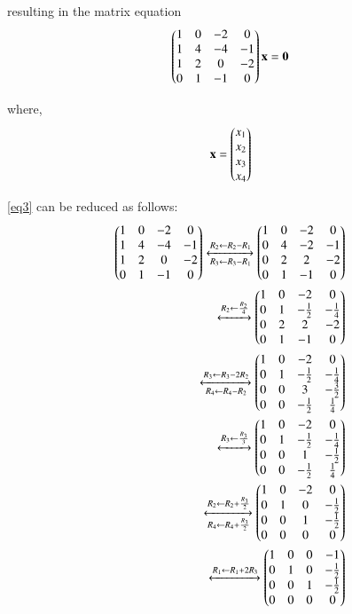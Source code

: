 \documentclass[journal,12pt,twocolumn]{IEEEtran}
\begin{document}
resulting in the matrix equation
\begin{align}
    \begin{pmatrix}1 & 0 & -2 & 0\\
           1 & 4 & -4 & -1\\
           1 & 2 & 0 & -2\\
           0 & 1 & -1 & 0\end{pmatrix}\mathbf{x}
           =\mathbf{0}    \label{eq3}
\end{align}

where,
\begin{align}
   \mathbf{x}= \begin{pmatrix}x_{1}\\x_{2}\\x_{3}\\x_{4}\end{pmatrix}
\end{align}

\eqref{eq3} can be reduced as follows:
\begin{align}
    \begin{pmatrix}1 & 0 & -2 & 0\\
           1 & 4 & -4 & -1\\
           1 & 2 & 0 & -2\\
           0 & 1 & -1 & 0\end{pmatrix}
    \xleftrightarrow[R_{3}\leftarrow R_3-R_{1}]{R_{2}\leftarrow R_2- R_1}
    \begin{pmatrix}1 & 0 & -2 & 0\\
           0 & 4 & -2 & -1\\
           0 & 2 & 2 & -2\\
           0 & 1 & -1 & 0\end{pmatrix}\\
    \xleftrightarrow{R_2 \leftarrow \frac{R_2}{4}}
    \begin{pmatrix}1 & 0 & -2 & 0\\
          0 & 1 & -\frac{1}{2} & -\frac{1}{4}\\
          0 & 2 & 2 & -2\\
          0 & 1 & -1 & 0\end{pmatrix}\\
    \xleftrightarrow[R_4 \leftarrow R_4 - R_2]{R_3 \leftarrow R_3 - 2R_2}
    \begin{pmatrix}1 & 0 & -2 & 0\\
           0 & 1 & -\frac{1}{2} & -\frac{1}{4}\\
           0 & 0 & 3 & -\frac{3}{2}\\
           0 & 0 & -\frac{1}{2} & \frac{1}{4}\end{pmatrix}\\
    \xleftrightarrow{R_3 \leftarrow \frac{R_3}{3}}
    \begin{pmatrix}1 & 0 & -2 & 0\\
           0 & 1 & -\frac{1}{2} & -\frac{1}{4}\\
           0 & 0 & 1 & -\frac{1}{2}\\
           0 & 0 & -\frac{1}{2} & \frac{1}{4}\end{pmatrix}\\
    \xleftrightarrow[R_{4}\leftarrow R_4+\frac{R_3}{2}]{R_{2}\leftarrow R_2+ \frac{R_3}{2}}
    \begin{pmatrix}1 & 0 & -2 & 0\\
           0 & 1 & 0 & -\frac{1}{2}\\
           0 & 0 & 1 & -\frac{1}{2}\\
           0 & 0 & 0 & 0\end{pmatrix}\\
    \xleftrightarrow{R_1 \leftarrow R_1+2R_3}
    \begin{pmatrix}1 & 0 & 0 & -1\\
           0 & 1 & 0 & -\frac{1}{2}\\
           0 & 0 & 1 & -\frac{1}{2}\\
           0 & 0 & 0 & 0\end{pmatrix}
\end{align}
\end{document}
